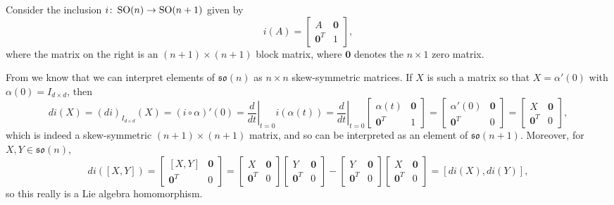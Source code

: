 \begin{example}
	Consider the inclusion $i \colon\thinspace\! \operatorname{SO}(n) \to \operatorname{SO}(n+1)$ given by 
	\[
		i(A) = \begin{bmatrix} A & \mathbf{0} \\ \mathbf{0}^T & 1 \end{bmatrix},
	\]
	where the matrix on the right is an $(n+1) \times (n+1)$ block matrix, where $\mathbf{0}$ denotes the $n \times 1$ zero matrix.
	
	From  we know that we can interpret elements of $\mathfrak{so}(n)$ as $n \times n$ skew-symmetric matrices. If $X$ is such a matrix so that $X = \alpha'(0)$ with $\alpha(0) = I_{d\times d}$, then
	\[
		di (X) = \left( di\right)_{I_{d \times d}}( X) = (i \circ \alpha)'(0) = \left. \frac{d}{dt} \right|_{t=0} i(\alpha(t)) = \left. \frac{d}{dt} \right|_{t=0} \begin{bmatrix} \alpha(t) & \mathbf{0} \\ \mathbf{0}^T & 1 \end{bmatrix} = \begin{bmatrix} \alpha'(0) & \mathbf{0} \\ \mathbf{0}^T & 0 \end{bmatrix} = \begin{bmatrix} X & \mathbf{0} \\ \mathbf{0}^T & 0 \end{bmatrix},
	\]
	which is indeed a skew-symmetric $(n +1) \times (n+1)$ matrix, and so can be interpreted as an element of $\mathfrak{so}(n+1)$. Moreover, for $X,Y \in \mathfrak{so}(n)$,
	\[
		di([X,Y]) = \begin{bmatrix} [X,Y] & \mathbf{0} \\ \mathbf{0}^T & 0 \end{bmatrix} = \begin{bmatrix} X & \mathbf{0} \\ \mathbf{0}^T & 0 \end{bmatrix}\begin{bmatrix} Y & \mathbf{0} \\ \mathbf{0}^T & 0 \end{bmatrix} - \begin{bmatrix} Y & \mathbf{0} \\ \mathbf{0}^T & 0 \end{bmatrix}\begin{bmatrix} X & \mathbf{0} \\ \mathbf{0}^T & 0 \end{bmatrix} = [di(X), di(Y)],
	\]
	so this really is a Lie algebra homomorphism.
\end{example}

